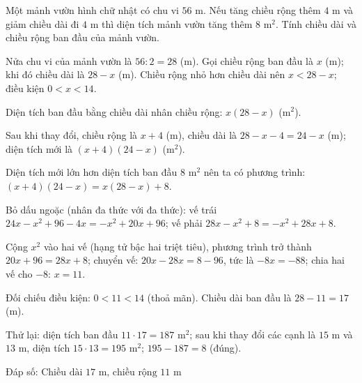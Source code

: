 \begin{problem}[8DS-PT1-018]
Một mảnh vườn hình chữ nhật có chu vi $56$ m. Nếu tăng chiều rộng thêm $4$ m và giảm chiều dài đi $4$ m thì diện tích mảnh vườn tăng thêm $8$ m$^2$. Tính chiều dài và chiều rộng ban đầu của mảnh vườn.

\begin{solution}
Nửa chu vi của mảnh vườn là $56 : 2 = 28$ (m). Gọi chiều rộng ban đầu là $x$ (m); khi đó chiều dài là $28 - x$ (m). Chiều rộng nhỏ hơn chiều dài nên $x < 28 - x$; điều kiện $0 < x < 14$.

Diện tích ban đầu bằng chiều dài nhân chiều rộng: $x(28 - x)$ (m$^2$).

Sau khi thay đổi, chiều rộng là $x + 4$ (m), chiều dài là $28 - x - 4 = 24 - x$ (m); diện tích mới là $(x + 4)(24 - x)$ (m$^2$).

Diện tích mới lớn hơn diện tích ban đầu $8$ m$^2$ nên ta có phương trình: $(x + 4)(24 - x) = x(28 - x) + 8$.

Bỏ dấu ngoặc (nhân đa thức với đa thức): vế trái $24x - x^2 + 96 - 4x = -x^2 + 20x + 96$; vế phải $28x - x^2 + 8 = -x^2 + 28x + 8$.

Cộng $x^2$ vào hai vế (hạng tử bậc hai triệt tiêu), phương trình trở thành $20x + 96 = 28x + 8$; chuyển vế: $20x - 28x = 8 - 96$, tức là $-8x = -88$; chia hai vế cho $-8$: $x = 11$.

Đối chiếu điều kiện: $0 < 11 < 14$ (thoả mãn). Chiều dài ban đầu là $28 - 11 = 17$ (m).

Thử lại: diện tích ban đầu $11 \cdot 17 = 187$ m$^2$; sau khi thay đổi các cạnh là $15$ m và $13$ m, diện tích $15 \cdot 13 = 195$ m$^2$; $195 - 187 = 8$ (đúng).

Đáp số: $\boxed{\text{Chiều dài } 17 \text{ m, chiều rộng } 11 \text{ m}}$
\end{solution}
\end{problem}

